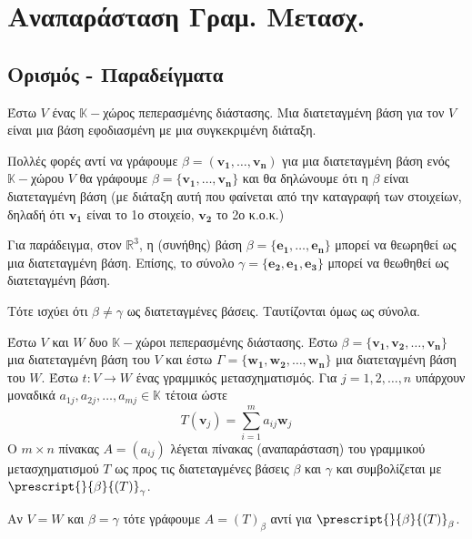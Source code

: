 



\pagestyle{vangelis}




\chapter{Αναπαράσταση Γραμ. Μετασχ.}

\section{Ορισμός - Παραδείγματα}

\begin{dfn}
  Έστω  $V$  ένας  $ \mathbb{K}- $χώρος πεπερασμένης διάστασης. Μια
  \textcolor{Col1}{διατεταγμένη βάση} για τον $V$ είναι μια βάση εφοδιασμένη με μια 
  συγκεκριμένη διάταξη.
\end{dfn}

\begin{rem}
  Πολλές φορές αντί να γράφουμε $ \beta = (\mathbf{v_{1}}, \ldots, \mathbf{v_{n}}) $ για 
  μια διατεταγμένη βάση ενός $ \mathbb{K}- $χώρου $V$ θα γράφουμε 
  $ \beta = \{ \mathbf{v_{1}}, \ldots, \mathbf{v_{n}} \} $ και θα δηλώνουμε ότι η 
  $ \beta $ είναι διατεταγμένη βάση (με διάταξη αυτή που φαίνεται από την καταγραφή 
  των στοιχείων, δηλαδή ότι $ \mathbf{v_{1}} $ είναι το 1ο στοιχείο, 
  $ \mathbf{v_{2}} $ το 2ο κ.ο.κ.) 
\end{rem}

Για παράδειγμα, στον $ \mathbb{R}^{3} $, η (συνήθης) βάση $ \beta = \{ \mathbf{e_{1}}, 
\ldots, \mathbf{e_{n}}\} $ μπορεί να θεωρηθεί ως μια διατεταγμένη βάση. 
Επίσης, το σύνολο $ \gamma = \{ \mathbf{e_{2}}, \mathbf{e_{1}}, \mathbf{e_{3}} \} $ 
μπορεί να θεωθηθεί ως διατεταγμένη βάση. 

Τότε ισχύει ότι $ \beta \neq \gamma $ ως διατεταγμένες βάσεις. 
Ταυτίζονται όμως ως σύνολα.  
\begin{dfn}
  Έστω $V$ και $W$ δυο $ \mathbb{K}- $χώροι πεπερασμένης διάστασης. Έστω $ \beta = \{
  \mathbf{v_{1}}, \mathbf{v_{2}}, \ldots, \mathbf{v_{n}} \} $ μια διατεταγμένη βάση 
  του $V$ και έστω $ \Gamma = \{ \mathbf{w_{1}}, \mathbf{w_{2}}, \ldots, 
  \mathbf{w_{n}} \} $ μια διατεταγμένη βάση του $W$. Έστω $ t \colon V \to W $ ένας 
  γραμμικός μετασχηματισμός. Για $ j = 1,2, \ldots, n $ υπάρχουν μοναδικά $ a_{1j}, 
  a_{2j}, \ldots, a_{mj} \in \mathbb{K} $ τέτοια ώστε 
  \[
    T(\mathbf{v}_{j}) = \sum_{i=1}^{m} a_{ij} \mathbf{w}_{j}  
  \] 
  Ο $ m \times n $ πίνακας $A = (a_{ij}) $ λέγεται πίνακας (αναπαράσταση) του 
  γραμμικού μετασχηματισμού $T$ ως προς τις διατεταγμένες βάσεις $ \beta $ και 
  $ \gamma $ και συμβολίζεται με $ \prescript{}{\beta}{(T)}_{\gamma } $.
\end{dfn}

\begin{rem}
  Αν $ V=W $ και $ \beta = \gamma $ τότε γράφουμε $ A = (T)_{\beta} $ αντί για 
  $ \prescript{}{\beta }{(T)}_{\beta} $.
\end{rem}









